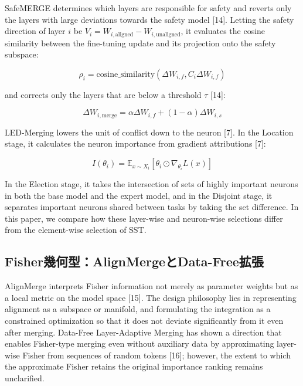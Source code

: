 \documentclass{article}
\begin{document}
SafeMERGE determines which layers are responsible for safety and reverts only the layers with large deviations towards the safety model [14]. Letting the safety direction of layer $i$ be $V_i=W_{i,\mathrm{aligned}}-W_{i,\mathrm{unaligned}}$, it evaluates the cosine similarity between the fine-tuning update and its projection onto the safety subspace:

\[
\rho_i=\mathrm{cosine\_similarity}(\Delta W_{i,f},C_i\Delta W_{i,f})
\tag{10}
\]

and corrects only the layers that are below a threshold $\tau$ [14]:

\[
\Delta W_{i,\mathrm{merge}}=\alpha\Delta W_{i,f}+(1-\alpha)\Delta W_{i,s}
\tag{11}
\]

LED-Merging lowers the unit of conflict down to the neuron [7]. In the Location stage, it calculates the neuron importance from gradient attributions [7]:

\[
I(\theta_i)=\mathbb{E}_{x\sim X_i}[\theta_i\odot\nabla_{\theta_i}L(x)]
\tag{12}
\]

In the Election stage, it takes the intersection of sets of highly important neurons in both the base model and the expert model, and in the Disjoint stage, it separates important neurons shared between tasks by taking the set difference. In this paper, we compare how these layer-wise and neuron-wise selections differ from the element-wise selection of SST.

\subsection{Fisher幾何型：AlignMergeとData-Free拡張}


AlignMerge interprets Fisher information not merely as parameter weights but as a local metric on the model space [15]. The design philosophy lies in representing alignment as a subspace or manifold, and formulating the integration as a constrained optimization so that it does not deviate significantly from it even after merging. Data-Free Layer-Adaptive Merging has shown a direction that enables Fisher-type merging even without auxiliary data by approximating layer-wise Fisher from sequences of random tokens [16]; however, the extent to which the approximate Fisher retains the original importance ranking remains unclarified.
\end{document}
